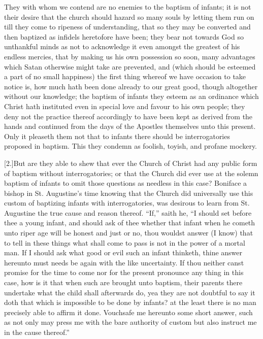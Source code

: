 They with whom we contend are no enemies to the baptism of infants; it is not their desire that the church should hazard so many souls by letting them run on till they come to ripeness of understanding, that so they may be converted and then baptized as infidels heretofore have been; they bear not towards God so unthankful minds as not to acknowledge it even amongst the greatest of his endless mercies, that by making us his own possession so soon, many advantages which Satan otherwise might take are prevented, and (which should be esteemed a part of no small happiness) the first  thing whereof we have occasion to take notice is, how much hath been done already to our great good, though altogether without our knowledge;
 the baptism of infants they esteem as an ordinance which Christ hath instituted even in special love and favour to his own people; they deny not the practice thereof accordingly to have been kept as derived from the hands and continued from the days of the Apostles themselves unto this present. Only it pleaseth them not that to infants there should be interrogatories proposed in baptism. This they condemn as foolish, toyish, and profane mockery.

[2.]But are they able to shew that ever the Church of Christ had any public form of baptism without interrogatories; or that the Church did ever use at the solemn baptism of infants to omit those questions as needless in this case? Boniface a bishop in St. Augustine’s time knowing that the Church did universally use this custom of baptizing infants with interrogatories, was desirous to learn from St. Augustine the true cause and reason thereof. “If,” saith he, “I should set before thee a young infant, and should ask of  thee whether that infant when he cometh unto riper age will be honest and just or no, thou wouldst answer (I know) that to tell in these things what shall come to pass is not in the power of a mortal man. If I should ask what good or evil such an infant thinketh, thine answer hereunto must needs be again with the like uncertainty. If thou neither canst promise for the time to come nor for the present pronounce any thing in this case, how is it that when such are brought unto baptism, their parents there undertake what the child shall afterwards do, yea they are not doubtful to say it doth that which is impossible to be done by infants? at the least there is no man precisely able to affirm it done. Vouchsafe me hereunto some short answer, such as not only may press me with the bare authority of custom but also instruct me in the cause thereof.”

